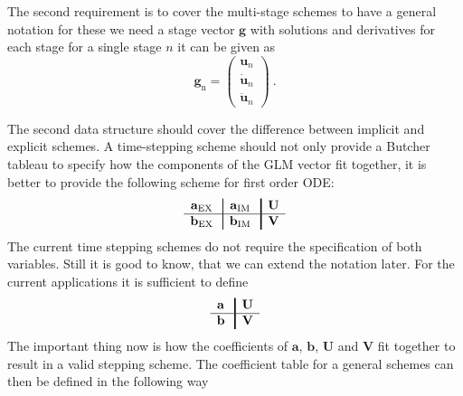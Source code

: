The second requirement is to cover the multi-stage schemes to have a general notation for these we
need a stage vector $\mathbf{g}$ with solutions and derivatives for each stage for a single stage $n$
it can be given as
\begin{equation}
\mathbf{g}_\mathrm{n} = \left( \begin{array}{c} \mathbf{u}_{n} \\ \mathbf{\dot{u}}_{n} \\ \mathbf{\ddot{u}}_{n} \end{array}\right)\ .
\end{equation}

The second data structure should cover the difference between implicit and explicit schemes. A
time-stepping scheme should not only provide a Butcher tableau to specify how the components of the
GLM vector fit together, it is better to provide the following scheme for first order
ODE:
\begin{equation*}
\begin{array}{c|!{\vrule width 0.5pt}c|!{\vrule width 1pt}c}
\mathbf{a}_\mathrm{EX} & \mathbf{a}_\mathrm{IM} & \mathbf{U} \\
\hline
\mathbf{b}_\mathrm{EX} & \mathbf{b}_\mathrm{IM} & \mathbf{V} \\
\end{array}
\end{equation*}
The current time stepping schemes do not require the specification of both variables. Still it is good to know, that we can extend the notation later.
For the current applications it is sufficient to define 
\begin{equation*}
\begin{array}{c|!{\vrule width 1pt}c}
\mathbf{a} & \mathbf{U} \\
\hline
\mathbf{b} & \mathbf{V} \\
\end{array}
\end{equation*}
The important thing now is how the coefficients of $\mathbf{a}$, $\mathbf{b}$, $\mathbf{U}$ and $\mathbf{V}$ fit together to result in a valid stepping scheme.
The coefficient table  for a general schemes can then be defined in the following way
